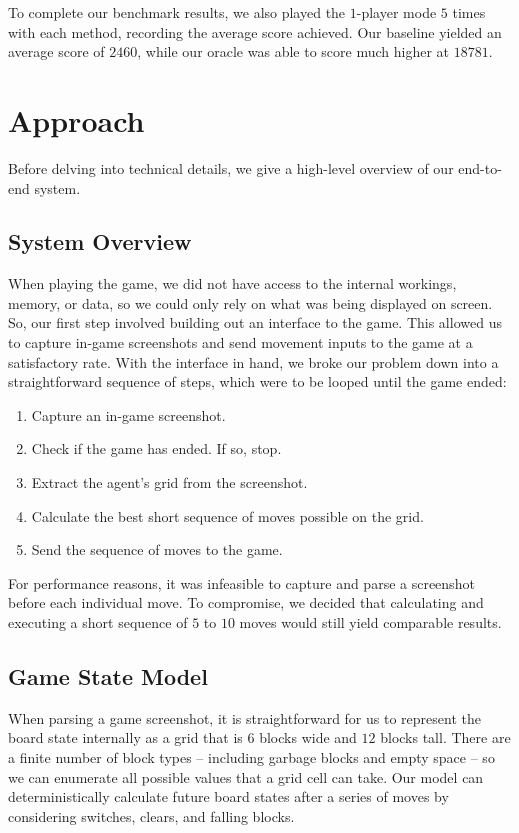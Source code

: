 \documentclass[12pt]{IEEEtran}
\begin{document}
To complete our benchmark results, we also played the $1$-player mode $5$ times with each method, recording the average score achieved. Our baseline yielded an average score of $2460$, while our oracle was able to score much higher at $18781$.

\section{Approach}

Before delving into technical details, we give a high-level overview of our end-to-end system.

\subsection{System Overview}

When playing the game, we did not have access to the internal workings, memory, or data, so we could only rely on what was being displayed on screen. So, our first step involved building out an interface to the game. This allowed us to capture in-game screenshots and send movement inputs to the game at a satisfactory rate. With the interface in hand, we broke our problem down into a straightforward sequence of steps, which were to be looped until the game ended:
\begin{enumerate}
\item Capture an in-game screenshot.
\item Check if the game has ended. If so, stop.
\item Extract the agent's grid from the screenshot.
\item Calculate the best short sequence of moves possible on the grid.
\item Send the sequence of moves to the game.
\end{enumerate}
For performance reasons, it was infeasible to capture and parse a screenshot before each individual move. To compromise, we decided that calculating and executing a short sequence of $5$ to $10$ moves would still yield comparable results.

\subsection{Game State Model}

When parsing a game screenshot, it is straightforward for us to represent the board state internally as a grid that is $6$ blocks wide and $12$ blocks tall. There are a finite number of block types -- including garbage blocks and empty space -- so we can enumerate all possible values that a grid cell can take. Our model can deterministically calculate future board states after a series of moves by considering switches, clears, and falling blocks.
\end{document}
